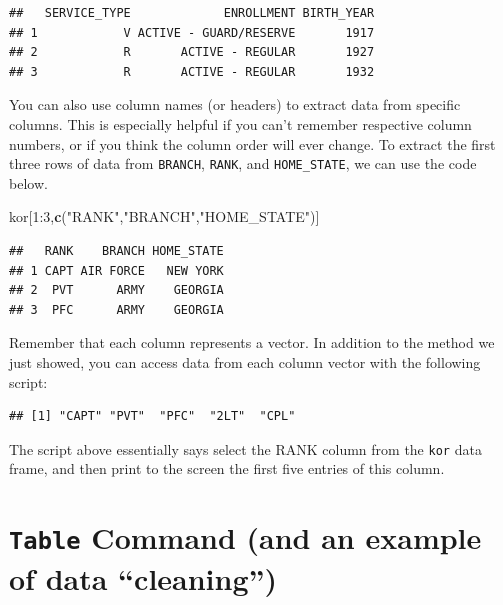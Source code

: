 \documentclass[]{book}
\newenvironment{Shaded}{\begin{snugshade}}{\end{snugshade}}
\newcommand{\KeywordTok}[1]{\textcolor[rgb]{0.13,0.29,0.53}{\textbf{{#1}}}}
\newcommand{\DecValTok}[1]{\textcolor[rgb]{0.00,0.00,0.81}{{#1}}}
\newcommand{\StringTok}[1]{\textcolor[rgb]{0.31,0.60,0.02}{{#1}}}
\newcommand{\NormalTok}[1]{{#1}}
\begin{document}
\begin{verbatim}
##   SERVICE_TYPE             ENROLLMENT BIRTH_YEAR
## 1            V ACTIVE - GUARD/RESERVE       1917
## 2            R       ACTIVE - REGULAR       1927
## 3            R       ACTIVE - REGULAR       1932
\end{verbatim}

You can also use column names (or headers) to extract data from specific
columns. This is especially helpful if you can't remember respective
column numbers, or if you think the column order will ever change. To
extract the first three rows of data from \texttt{BRANCH},
\texttt{RANK}, and \texttt{HOME\_STATE}, we can use the code below.

\begin{Shaded}
\begin{Highlighting}[]
\NormalTok{kor[}\DecValTok{1}\NormalTok{:}\DecValTok{3}\NormalTok{,}\KeywordTok{c}\NormalTok{(}\StringTok{"RANK"}\NormalTok{,}\StringTok{"BRANCH"}\NormalTok{,}\StringTok{"HOME_STATE"}\NormalTok{)]}
\end{Highlighting}
\end{Shaded}

\begin{verbatim}
##   RANK    BRANCH HOME_STATE
## 1 CAPT AIR FORCE   NEW YORK
## 2  PVT      ARMY    GEORGIA
## 3  PFC      ARMY    GEORGIA
\end{verbatim}

Remember that each column represents a vector. In addition to the method
we just showed, you can access data from each column vector with the
following script:

\begin{Shaded}
\end{Shaded}

\begin{verbatim}
## [1] "CAPT" "PVT"  "PFC"  "2LT"  "CPL"
\end{verbatim}

The script above essentially says select the RANK column from the
\texttt{kor} data frame, and then print to the screen the first five
entries of this column.

\section{\texorpdfstring{\texttt{Table} Command (and an example of data
``cleaning'')}{Table Command (and an example of data cleaning)}}\label{table-command-and-an-example-of-data-cleaning}
\end{document}
